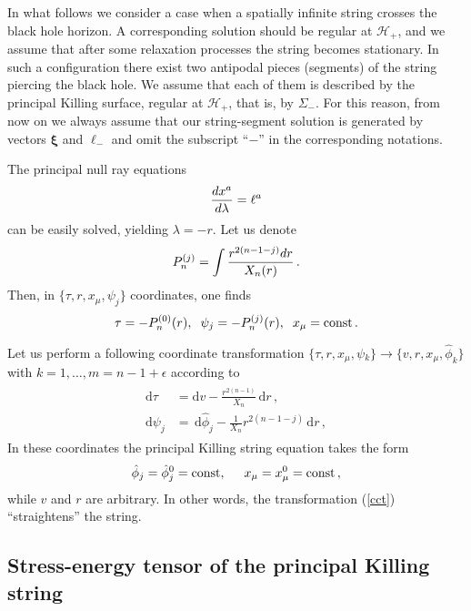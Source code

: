 \documentclass[superscriptaddress,twocolumn,showpacs,
preprintnumbers,amsmath,amssymb,nofootinbib,
longbibliography,aps,prd,10pt]{revtex4-1}
\newcommand{\hh}{,\hspace{0.5cm}}
\newcommand{\hhh}{,\hspace{0.2cm}}
\newcommand{\ts}[1]{{\boldsymbol{#1}}}         %
\newcommand{\dd}{\mbox{d}}
\newcommand{\be}{\begin{equation}}             %
\newcommand{\ee}{\end{equation}}               %
\newcommand{\n}[1]{\label{#1}}
\begin{document}
In what follows we consider a case when  a spatially infinite string crosses the black hole horizon.  A corresponding solution should be regular at $\mathcal{H}_+$, and we assume that after some relaxation processes the string becomes stationary. In such a configuration there exist two antipodal pieces (segments) of the string piercing the black hole. We assume that each of them is described by the principal Killing surface, regular at $\mathcal{H}_+$, that is, by $\Sigma_-$. For this reason, from now on we always assume that our string-segment solution is generated by vectors $\ts{\xi}$ and $\ts{\ell}_-$ and omit the subscript ``$-$'' in the corresponding notations.

The principal null ray equations
\be
{dx^a\over d\lambda}=\ell^a
\ee
can be easily solved, yielding $\lambda=-r$. Let us denote
\be
P_n^{(j)}=\int {r^{2(n-1-j)} dr\over X_n(r)}\, .
\ee
Then, in $\{\tau,r,x_{\mu},\psi_j\}$ coordinates, one finds
\be
\label{eq:pks-main-result}
\tau=-P_n^{(0)}(r)\hhh \psi_j=-P_n^{(j)}(r)\hhh x_{\mu}= \text{const} \, .
\ee

Let us perform a following coordinate transformation $\{\tau,r,x_{\mu},\psi{}_k\} \rightarrow \{v,r, x_{\mu},\hat{\phi}_k\}$ with $k=1,\dots,m=n-1+\epsilon$ according to
\begin{align}
\begin{split}\n{cct}
\dd \tau &= \dd v  - \frac{r^{2(n-1)}}{X_n} \, \dd r \, , \\
\dd \psi_j &= \, \dd \hat{\phi}_j - \frac{1}{X_n} r^{2(n-1-j)} \, \dd r \, ,
\end{split}
\end{align}
In these coordinates the principal Killing string equation takes the form
\be
\hat{\phi}_j=\hat{\phi}_j^{0}=\text{const}\hh x_{\mu}=x^0_{\mu}=\text{const}\, ,
\ee
while $v$ and $r$ are arbitrary. In other words, the transformation (\ref{cct}) ``straightens'' the string.

\subsection{Stress-energy tensor of the principal Killing string}
\end{document}
